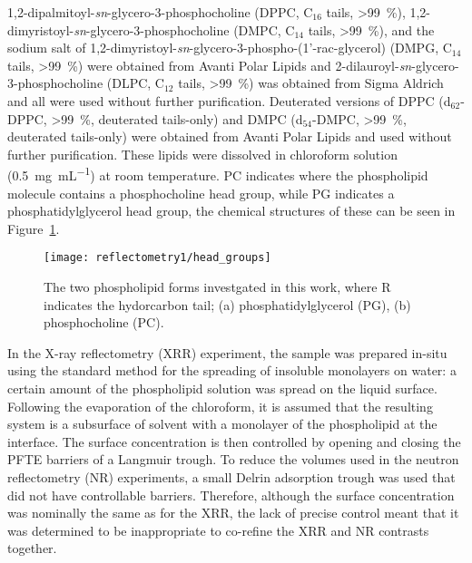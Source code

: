 1,2-dipalmitoyl-\emph{sn}-glycero-3-phosphocholine (DPPC, C$_{16}$ tails, \SI{>99}{\percent}), 1,2-dimyristoyl-\emph{sn}-glycero-3-phosphocholine (DMPC, C$_{14}$ tails, \SI{>99}{\percent}), and the sodium salt of 1,2-dimyristoyl-\emph{sn}-glycero-3-phospho-(1'-rac-glycerol) (DMPG, C$_{14}$ tails, \SI{>99}{\percent}) were obtained from Avanti Polar Lipids and 2-dilauroyl-\emph{sn}-glycero-3-phosphocholine (DLPC, C$_{12}$ tails, \SI{>99}{\percent}) was obtained from Sigma Aldrich and all were used without further purification. Deuterated versions of DPPC (d$_{62}$-DPPC, \SI{>99}{\percent}, deuterated tails-only) and DMPC (d$_{54}$-DMPC, \SI{>99}{\percent}, deuterated tails-only) were obtained from Avanti Polar Lipids and used without further purification.
These lipids were dissolved in chloroform solution (\SI{0.5}{\milli\gram\per\milli\liter}) at room temperature.
PC indicates where the phospholipid molecule contains a phosphocholine head group, while PG indicates a phosphatidylglycerol head group, the chemical structures of these can be seen in Figure~\ref{fig:heads}.
%
\begin{figure}
    \centering
    \texttt{[image: reflectometry1/head\_groups]}
    \caption{The two phospholipid forms investgated in this work, where R indicates the hydorcarbon tail; (a) phosphatidylglycerol (PG), (b) phosphocholine (PC).}
    \label{fig:heads}
\end{figure}
%

In the X-ray reflectometry (XRR) experiment, the sample was prepared in-situ using the standard method for the spreading of insoluble monolayers on water: a certain amount of the phospholipid solution was spread on the liquid surface.
Following the evaporation of the chloroform, it is assumed that the resulting system is a subsurface of solvent with a monolayer of the phospholipid at the interface.
The surface concentration is then controlled by opening and closing the PFTE barriers of a Langmuir trough.
To reduce the volumes used in the neutron reflectometry (NR) experiments, a small Delrin adsorption trough was used that did not have controllable barriers.
Therefore, although the surface concentration was nominally the same as for the XRR, the lack of precise control meant that it was determined to be inappropriate to co-refine the XRR and NR contrasts together.

